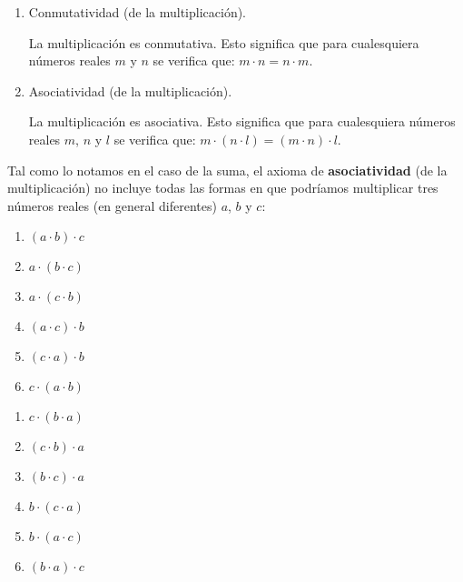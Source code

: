 \documentclass[11pt]{article}
\begin{document}
\begin{enumerate}[label=M\arabic*.]
    \item Conmutatividad (de la multiplicación).
    
    La multiplicación es conmutativa. Esto significa que para cualesquiera números reales $m$ y $n$ se verifica que: $ m \cdot n = n \cdot m $.

    \item Asociatividad (de la multiplicación).
    
    La multiplicación es asociativa. Esto significa que para cualesquiera números reales $m$, $n$ y $l$ se verifica que: $ m \cdot (n \cdot l) = (m \cdot n) \cdot l $.
\end{enumerate}

Tal como lo notamos en el caso de la suma, el axioma de \textbf{asociatividad} (de la multiplicación) no incluye todas las formas en que podríamos multiplicar tres números reales (en general diferentes) $a$, $b$ y $c$:

\begin{adjustbox}{minipage=0.5\linewidth,margin=0pt \smallskipamount,center}
    \noindent\begin{minipage}[c]{.5\linewidth}
    \begin{enumerate}[label=\roman*.]
        \item $(a\cdot b)\cdot c$
        \item $a\cdot (b\cdot c)$
        \item $a\cdot (c\cdot b)$
        \item $(a\cdot c)\cdot b$
        \item $(c\cdot a)\cdot b$
        \item $c\cdot (a\cdot b)$
    \end{enumerate}
    \end{minipage}%
\begin{minipage}[c]{.5\linewidth}
    \begin{enumerate}[start=7,label=\roman*.]
        \item $c\cdot (b\cdot a)$
        \item $(c\cdot b)\cdot a$
        \item $(b\cdot c)\cdot a$
        \item $b\cdot (c\cdot a)$
        \item $b\cdot (a\cdot c)$
        \item $(b\cdot a)\cdot c$
    \end{enumerate}
\end{minipage}
\end{adjustbox}
\end{document}
